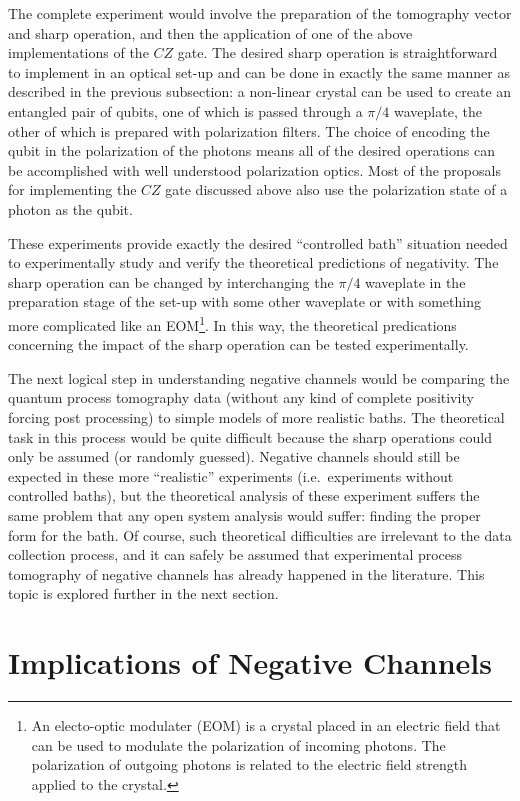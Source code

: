 The complete experiment would involve the preparation of the tomography vector and sharp operation, and then the application of one of the above implementations of the $CZ$ gate.  The desired sharp operation is straightforward to implement in an optical set-up and can be done in exactly the same manner as described in the previous subsection: a non-linear crystal can be used to create an entangled pair of qubits, one of which is passed through a $\pi/4$ waveplate, the other of which is prepared with polarization filters.  The choice of encoding the qubit in the polarization of the photons means all of the desired operations can be accomplished with well understood polarization optics.  Most of the proposals for implementing the $CZ$ gate discussed above also use the polarization state of a photon as the qubit. 

These experiments provide exactly the desired ``controlled bath'' situation needed to experimentally study and verify the theoretical predictions of negativity.  The sharp operation can be changed by interchanging the $\pi/4$ waveplate in the preparation stage of the set-up with some other waveplate or with something more complicated like an EOM\footnote{An electo-optic modulater (EOM) is a crystal placed in an electric field that can be used to modulate the polarization of incoming photons.  The polarization of outgoing photons is related to the electric field strength applied to the crystal.}.  In this way, the theoretical predications concerning the impact of the sharp operation can be tested experimentally.  

The next logical step in understanding negative channels would be comparing the quantum process tomography data (without any kind of complete positivity forcing post processing) to simple models of more realistic baths.  The theoretical task in this process would be quite difficult because the sharp operations could only be assumed (or randomly guessed).  Negative channels should still be expected in these more ``realistic'' experiments (i.e.\ experiments without controlled baths), but the theoretical analysis of these experiment suffers the same problem that any open system analysis would suffer: finding the proper form for the bath.  Of course, such theoretical difficulties are irrelevant to the data collection process, and it can safely be assumed that experimental process tomography of negative channels has already happened in the literature.  This topic is explored further in the next section.

\chapter{Implications of Negative Channels}

